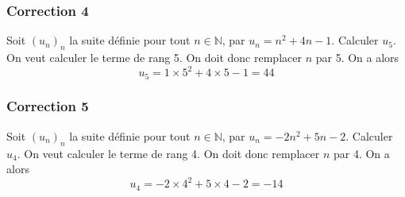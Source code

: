 \documentclass[15pt, mathserif]{beamer}
\newcommand{\N}{\mathbb{N}}			%
\begin{document}
\begin{frame}
\vspace{-10mm}
	\frametitle{Correction 4}
Soit $(u_n)_n$ la suite définie pour tout $n \in \N$, par $u_n=n^2+4n-1$. Calculer $u_{5}$. 
 \vfil 
  On veut calculer le terme de rang 5. 
 \vfil 
 On doit donc remplacer $n$ par 5. On a alors $$u_{5}=1\times 5^2+4\times5-1=44$$\end{frame}


\begin{frame}
\vspace{-10mm}
	\frametitle{Correction 5}
Soit $(u_n)_n$ la suite définie pour tout $n \in \N$, par $u_n=-2n^2+5n-2$. Calculer $u_{4}$. 
 \vfil 
  On veut calculer le terme de rang 4. 
 \vfil 
 On doit donc remplacer $n$ par 4. On a alors $$u_{4}=-2\times 4^2+5\times4-2=-14$$\end{frame}
\end{document}
